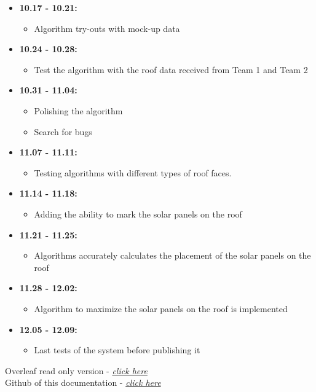 \documentclass[a4paper,12pt,fleqn]{article}
\begin{document}
\begin{itemize}
    \item \textbf{10.17 - 10.21:}
    \begin{itemize}
        \item Algorithm try-outs with mock-up data
    \end{itemize}
    
    \item \textbf{10.24 - 10.28:}
    \begin{itemize}
        \item Test the algorithm with the roof data received from Team 1 and Team 2
    \end{itemize}
    
    \item \textbf{10.31 - 11.04:}
    \begin{itemize}
        \item Polishing the algorithm
        \item Search for bugs
    \end{itemize}
    
    \item \textbf{11.07 - 11.11:}
    \begin{itemize}
        \item Testing algorithms with different types of roof faces.
    \end{itemize}
    
    \item \textbf{11.14 - 11.18:}
    \begin{itemize}
        \item Adding the ability to mark the solar panels on the roof
    \end{itemize}
    
    \item \textbf{11.21 - 11.25:}
    \begin{itemize}
        \item Algorithms accurately calculates the placement of the solar panels on the roof
    \end{itemize}
    
    \item \textbf{11.28 - 12.02:}
    \begin{itemize}
        \item Algorithm to maximize the solar panels on the roof is implemented
    \end{itemize}
    
    \item \textbf{12.05 - 12.09:}
    \begin{itemize}
        \item Last tests of the system before publishing it
    \end{itemize}
\end{itemize}
Overleaf read only version - \textit{\href{https://www.overleaf.com/read/yfwwkrcvhxfk}{click here}}\\
Github of this documentation - \textit{\href{https://github.com/Jamtit/Documentation-Team3}{click here}}
\end{document}

